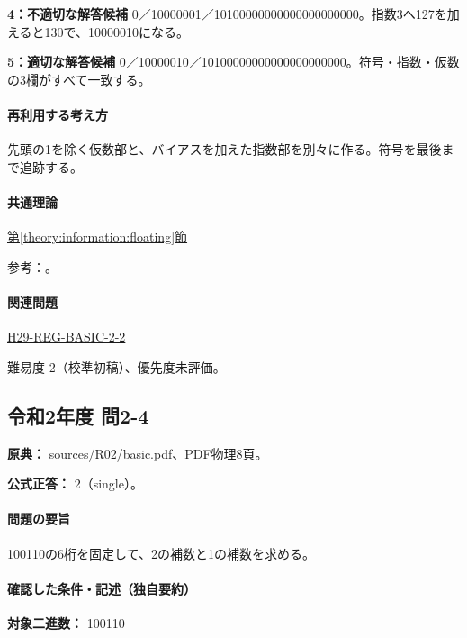 \noindent\textbf{4：不適切な解答候補} 0／10000001／10100000000000000000000。指数3へ127を加えると130で、10000010になる。\par

\noindent\textbf{5：適切な解答候補} 0／10000010／10100000000000000000000。符号・指数・仮数の3欄がすべて一致する。\par

\paragraph{再利用する考え方} 先頭の1を除く仮数部と、バイアスを加えた指数部を別々に作る。符号を最後まで追跡する。

\paragraph{共通理論} \hyperref[theory:information:floating]{第\ref*{theory:information:floating}節}

\par 参考：\cite{oracle_single}。

\paragraph{関連問題} \hyperref[q:h29-reg-basic-2-2]{H29-REG-BASIC-2-2}

\par 難易度 2（校準初稿）、優先度未評価。

\subsection{令和2年度 問2-4}
\label{q:r02-reg-basic-2-4}

\noindent\textbf{原典：} sources/R02/basic.pdf、PDF物理8頁。

\textbf{公式正答：} 2（single）。

\paragraph{問題の要旨} 100110の6桁を固定して、2の補数と1の補数を求める。

\paragraph{確認した条件・記述（独自要約）}\mbox{}\par

\noindent\textbf{対象二進数：} 100110\par

